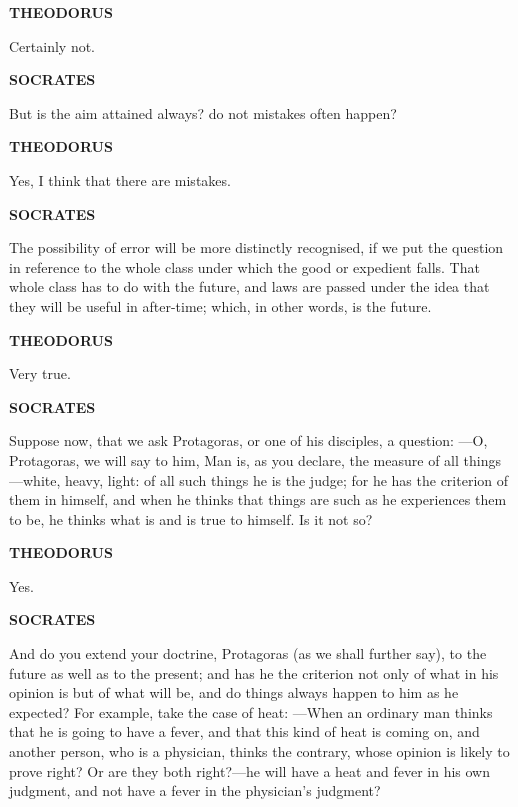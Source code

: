 \documentclass[11pt,letter]{article}
\begin{document}
\par \textbf{THEODORUS}
\par   Certainly not.

\par \textbf{SOCRATES}
\par   But is the aim attained always? do not mistakes often happen?

\par \textbf{THEODORUS}
\par   Yes, I think that there are mistakes.

\par \textbf{SOCRATES}
\par   The possibility of error will be more distinctly recognised, if we put the question in reference to the whole class under which the good or expedient falls. That whole class has to do with the future, and laws are passed under the idea that they will be useful in after-time; which, in other words, is the future.

\par \textbf{THEODORUS}
\par   Very true.

\par \textbf{SOCRATES}
\par   Suppose now, that we ask Protagoras, or one of his disciples, a question: —O, Protagoras, we will say to him, Man is, as you declare, the measure of all things—white, heavy, light:  of all such things he is the judge; for he has the criterion of them in himself, and when he thinks that things are such as he experiences them to be, he thinks what is and is true to himself. Is it not so?

\par \textbf{THEODORUS}
\par   Yes.

\par \textbf{SOCRATES}
\par   And do you extend your doctrine, Protagoras (as we shall further say), to the future as well as to the present; and has he the criterion not only of what in his opinion is but of what will be, and do things always happen to him as he expected? For example, take the case of heat: —When an ordinary man thinks that he is going to have a fever, and that this kind of heat is coming on, and another person, who is a physician, thinks the contrary, whose opinion is likely to prove right? Or are they both right?—he will have a heat and fever in his own judgment, and not have a fever in the physician's judgment?
\end{document}
